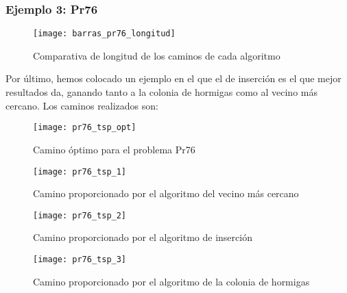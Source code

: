\clearpage
\subsubsection{Ejemplo 3: Pr76}

\begin{figure}[h]	\texttt{[image: barras\_pr76\_longitud]} \centering
	\caption{Comparativa de longitud de los caminos de cada algoritmo} \end{figure}

Por último, hemos colocado un ejemplo en el que el de inserción es el que mejor resultados da, ganando tanto a la colonia de hormigas como al vecino más cercano. Los caminos realizados son:

\begin{figure}	\texttt{[image: pr76\_tsp\_opt]} \centering
	\caption{Camino óptimo para el problema Pr76} \end{figure}

\begin{figure}	\texttt{[image: pr76\_tsp\_1]} \centering
	\caption{Camino proporcionado por el algoritmo del vecino más cercano} \end{figure}

\begin{figure}	\texttt{[image: pr76\_tsp\_2]} \centering
	\caption{Camino proporcionado por el algoritmo de inserción} \end{figure}

\begin{figure}	\texttt{[image: pr76\_tsp\_3]} \centering
	\caption{Camino proporcionado por el algoritmo de la colonia de hormigas} \end{figure}
